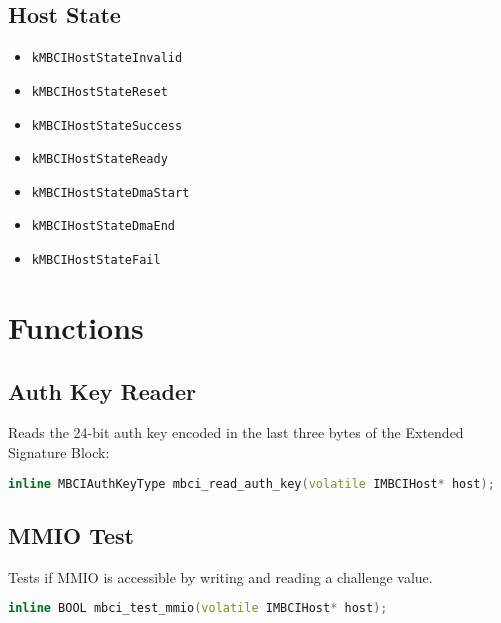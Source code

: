 \documentclass{article}
\begin{document}
\subsection*{Host State}
\begin{itemize}
  \item \texttt{kMBCIHostStateInvalid}
  \item \texttt{kMBCIHostStateReset}
  \item \texttt{kMBCIHostStateSuccess}
  \item \texttt{kMBCIHostStateReady}
  \item \texttt{kMBCIHostStateDmaStart}
  \item \texttt{kMBCIHostStateDmaEnd}
  \item \texttt{kMBCIHostStateFail}
\end{itemize}

\section{Functions}

\subsection*{Auth Key Reader}
Reads the 24-bit auth key encoded in the last three bytes of the Extended Signature Block:
\begin{lstlisting}[language=C++,basicstyle=\ttfamily\footnotesize]
inline MBCIAuthKeyType mbci_read_auth_key(volatile IMBCIHost* host);
\end{lstlisting}

\subsection*{MMIO Test}
Tests if MMIO is accessible by writing and reading a challenge value.
\begin{lstlisting}[language=C++,basicstyle=\ttfamily\footnotesize]
inline BOOL mbci_test_mmio(volatile IMBCIHost* host);
\end{lstlisting}
\end{document}
